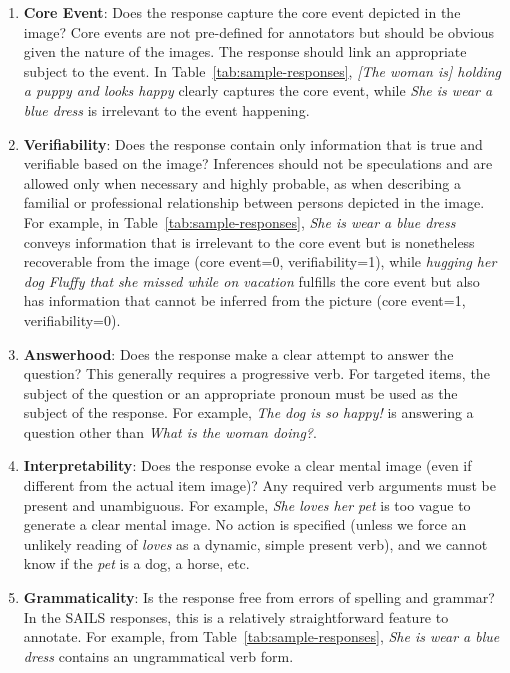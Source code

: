 \begin{enumerate}
\item \textbf{Core Event}: Does the response capture the core event depicted in the image? Core events are not pre-defined for annotators but should be obvious given the nature of the images. The response should link an appropriate subject to the event.  In Table~\ref{tab:sample-responses}, \textit{[The woman is] holding a puppy and looks happy} clearly captures the core event, while \textit{She is wear a blue dress} is irrelevant to the event happening.
\item \textbf{Verifiability}: Does the response contain only information that is true and verifiable based on the image? Inferences should not be speculations and are allowed only when necessary and highly probable, as when describing a familial or professional relationship between persons depicted in the image.  For example, in Table~\ref{tab:sample-responses}, \textit{She is wear a blue dress} conveys information that is irrelevant to the core event but is nonetheless recoverable from the image (core event=0, verifiability=1), while \textit{hugging her dog Fluffy that she missed while on vacation} fulfills the core event but also has information that cannot be inferred from the picture (core event=1, verifiability=0).
\item \textbf{Answerhood}: Does the response make a clear attempt to answer the question? This generally requires a progressive verb. For targeted items, the subject of the question or an appropriate pronoun must be used as the subject of the response.  For example, \textit{The dog is so happy!} is answering a question other than \textit{What is the woman doing?}. 
\item \textbf{Interpretability}: Does the response evoke a clear mental image (even if different from the actual item image)? Any required verb arguments must be present and unambiguous.  For example, \textit{She loves her pet} is too vague to generate a clear mental image. No action is specified (unless we force an unlikely reading of \textit{loves} as a dynamic, simple present verb), and we cannot know if the \textit{pet} is a dog, a horse, etc.
\item \textbf{Grammaticality}: Is the response free from errors of spelling and grammar?  
In the SAILS responses, this is a relatively straightforward feature to annotate. For example, from Table~\ref{tab:sample-responses}, \textit{She is wear a blue dress} contains an ungrammatical verb form.

\end{enumerate}

